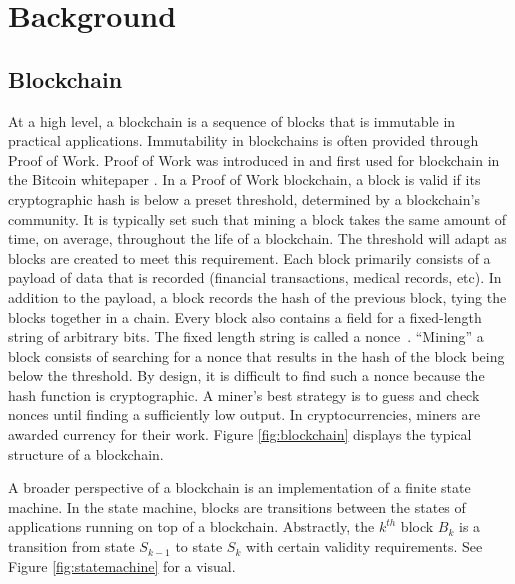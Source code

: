 \section{Background}
\label{sec:background}

\subsection{Blockchain}

At a high level, a blockchain is a sequence of blocks that is immutable in practical applications.
Immutability in blockchains is often provided through Proof of Work.
Proof of Work was introduced in \cite{dwork1992PoW} and first used for blockchain in the Bitcoin whitepaper \cite{nakamoto2009Bitcoin}.
In a Proof of Work blockchain, a block is valid if its cryptographic hash is below a preset threshold, determined by a blockchain's community.
It is typically set such that mining a block takes the same amount of time, on average, throughout the life of a blockchain.
The threshold will adapt as blocks are created to meet this requirement.
Each block primarily consists of a payload of data that is recorded (financial transactions, medical records, etc).
In addition to the payload, a block records the hash of the previous block, tying the blocks together in a chain.
Every block also contains a field for a fixed-length string of arbitrary bits.
The fixed length string is called a nonce~\cite{nakamoto2009Bitcoin}.
``Mining'' a block consists of searching for a nonce that results in the hash of the block being below the threshold.
By design, it is difficult to find such a nonce because the hash function is cryptographic.
A miner's best strategy is to guess and check nonces until finding a sufficiently low output.
In cryptocurrencies, miners are awarded currency for their work.
Figure \ref{fig:blockchain} displays the typical structure of a blockchain.



A broader perspective of a blockchain is an implementation of a finite state machine.
In the state machine, blocks are transitions between the states of applications running on top of a blockchain.
Abstractly, the $k^{th}$ block $B_k$ is a transition from state $S_{k-1}$ to state $S_k$ with certain validity requirements.
See Figure \ref{fig:statemachine} for a visual.



